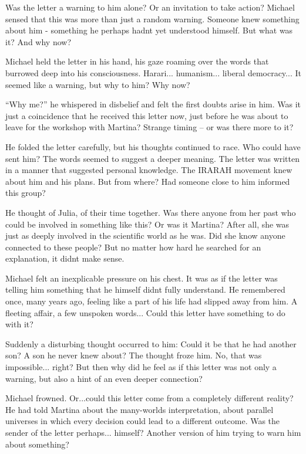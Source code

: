 \documentclass[
]{article}
\begin{document}
Was the letter a warning to him alone? Or an invitation to take action?
Michael sensed that this was more than just a random warning. Someone
knew something about him - something he perhaps hadn\textquotesingle t
yet understood himself. But what was it? And why now?

Michael held the letter in his hand, his gaze roaming over the words
that burrowed deep into his consciousness. Harari... humanism... liberal
democracy... It seemed like a warning, but why to him? Why now?

``Why me?'' he whispered in disbelief and felt the first doubts arise in
him. Was it just a coincidence that he received this letter now, just
before he was about to leave for the workshop with Martina? Strange
timing -- or was there more to it?

He folded the letter carefully, but his thoughts continued to race. Who
could have sent him? The words seemed to suggest a deeper meaning. The
letter was written in a manner that suggested personal knowledge. The
IRARAH movement knew about him and his plans. But from where? Had
someone close to him informed this group?

He thought of Julia, of their time together. Was there anyone from her
past who could be involved in something like this? Or was it Martina?
After all, she was just as deeply involved in the scientific world as he
was. Did she know anyone connected to these people? But no matter how
hard he searched for an explanation, it didn\textquotesingle t make
sense.

Michael felt an inexplicable pressure on his chest. It was as if the
letter was telling him something that he himself didn\textquotesingle t
fully understand. He remembered once, many years ago, feeling like a
part of his life had slipped away from him. A fleeting affair, a few
unspoken words... Could this letter have something to do with it?

Suddenly a disturbing thought occurred to him: Could it be that he had
another son? A son he never knew about? The thought froze him. No, that
was impossible... right? But then why did he feel as if this letter was
not only a warning, but also a hint of an even deeper connection?

Michael frowned. Or...could this letter come from a completely different
reality? He had told Martina about the many-worlds interpretation, about
parallel universes in which every decision could lead to a different
outcome. Was the sender of the letter perhaps... himself? Another
version of him trying to warn him about something?
\end{document}
